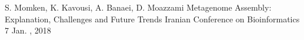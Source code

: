 

\begin{cventries}

  \cventry
    {S. Momken, K. Kavousi, A. Banaei, D. Moazzami} %
    {Metagenome Assembly: Explanation, Challenges and Future Trends} %
    {Iranian Conference on Bioinformatics 7} %
    {Jan. , 2018} %
    { %
    }

\end{cventries}
